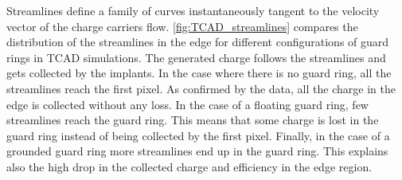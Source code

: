 Streamlines define a family of curves instantaneously tangent to the
velocity vector of the charge carriers
flow. \cref{fig:TCAD_streamlines} compares the distribution of the
streamlines in the edge for different configurations of guard rings in
TCAD simulations. The generated charge follows the streamlines and
gets collected by the implants. In the case where there is no guard
ring, all the streamlines reach the first pixel. As confirmed by the
data, all the charge in the edge is collected without any loss. In the
case of a floating guard ring, few streamlines reach the guard
ring. This means that some charge is lost in the guard ring instead of
being collected by the first pixel. Finally, in the case of a grounded
guard ring more streamlines end up in the guard ring. This explains
also the high drop in the collected charge and efficiency in the edge
region.

